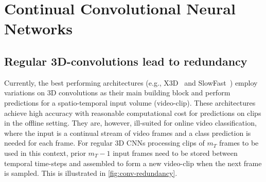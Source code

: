\vspace{-2mm}
\section{Continual Convolutional Neural Networks}\label{sec:continual}
\vspace{-2mm}
\subsection{Regular 3D-convolutions lead to redundancy}\label{sec:regular-cnn-redundancy}
\vspace{-1mm}
Currently, the best performing architectures (e.g., X3D~\cite{feichtenhofer2020x3d} and SlowFast~\cite{feichtenhofer2019slowfast}) employ variations on 3D convolutions as their main building block and perform predictions for a spatio-temporal input volume (video-clip). 
These architectures achieve high accuracy with reasonable computational cost for predictions on clips in the offline setting.
They are, however, ill-suited for online video classification, 
where the input is a continual stream of video frames and a class prediction is needed for each frame. 
For regular 3D CNNs processing clips of $m_T$ frames to be used in this context, prior $m_T-1$ input frames need to be stored between temporal time-steps and assembled to form a new video-clip when the next frame is sampled.
This is illustrated in \cref{fig:conv-redundancy}.

